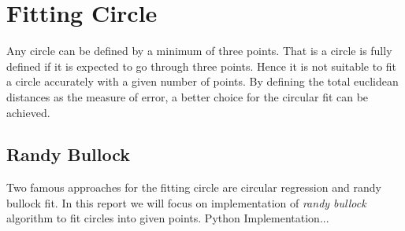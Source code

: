\section{Fitting Circle}
Any circle can be defined by a minimum of three points. That is a circle is fully defined if it is expected to go through three points. Hence it is not suitable to fit a circle accurately with a given number of points.  By defining the total euclidean distances as the measure of error, a better choice for the circular fit can be achieved. 

 
\subsection*{Randy Bullock}
Two famous approaches for the fitting circle are circular regression and randy bullock fit. In this report we will focus on implementation of \textit{randy bullock} algorithm to fit circles into given points.
{\color{cyan} Python Implementation...}
